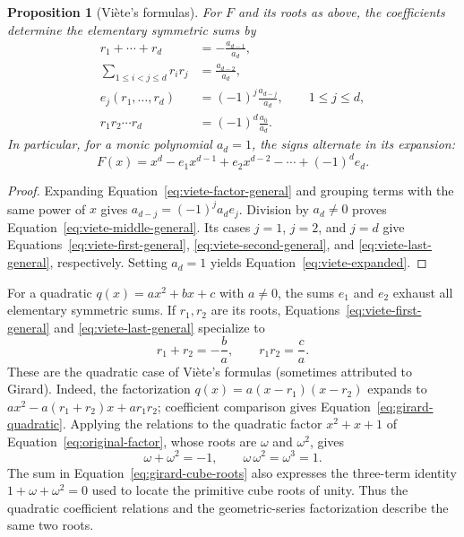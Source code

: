 \documentclass[11pt,a4paper]{article}
\numberwithin{equation}{section}
\theoremstyle{uprightpaper}
\newtheorem{proposition}{Proposition}[section]
\begin{document}
\begin{proposition}[Vi\`ete's formulas]\label{prop:viete}
For $F$ and its roots as above, the coefficients determine the elementary symmetric sums by
\begin{align}
 r_1+\cdots+r_d
   &= -\frac{a_{d-1}}{a_d},\label{eq:viete-first-general}\\
 \sum_{1\leq i<j\leq d}r_ir_j
   &= \frac{a_{d-2}}{a_d},\label{eq:viete-second-general}\\
 e_j(r_1,\ldots,r_d)
   &=(-1)^j\frac{a_{d-j}}{a_d},\qquad 1\leq j\leq d,\label{eq:viete-middle-general}\\
 r_1r_2\cdots r_d
   &=(-1)^d\frac{a_0}{a_d}.\label{eq:viete-last-general}
\end{align}
In particular, for a monic polynomial $a_d=1$, the signs alternate in its expansion:
\begin{equation}\label{eq:viete-expanded}
 F(x)=x^d-e_1x^{d-1}+e_2x^{d-2}-\cdots+(-1)^de_d.
\end{equation}
\end{proposition}
\begin{proof}
Expanding Equation~\eqref{eq:viete-factor-general} and grouping terms with the same power of $x$ gives $a_{d-j}=(-1)^ja_de_j$. Division by $a_d\neq0$ proves Equation~\eqref{eq:viete-middle-general}. Its cases $j=1$, $j=2$, and $j=d$ give Equations~\eqref{eq:viete-first-general}, \eqref{eq:viete-second-general}, and \eqref{eq:viete-last-general}, respectively. Setting $a_d=1$ yields Equation~\eqref{eq:viete-expanded}.
\end{proof}

For a quadratic $q(x)=ax^2+bx+c$ with $a\neq0$, the sums $e_1$ and $e_2$ exhaust all elementary symmetric sums. If $r_1,r_2$ are its roots, Equations~\eqref{eq:viete-first-general} and \eqref{eq:viete-last-general} specialize to
\begin{equation}\label{eq:girard-quadratic}
 r_1+r_2=-\frac{b}{a},\qquad r_1r_2=\frac{c}{a}.
\end{equation}
These are the quadratic case of Vi\`ete's formulas (sometimes attributed to Girard). Indeed, the factorization $q(x)=a(x-r_1)(x-r_2)$ expands to $ax^2-a(r_1+r_2)x+ar_1r_2$; coefficient comparison gives Equation~\eqref{eq:girard-quadratic}. Applying the relations to the quadratic factor $x^2+x+1$ of Equation~\eqref{eq:original-factor}, whose roots are $\omega$ and $\omega^2$, gives
\begin{equation}\label{eq:girard-cube-roots}
 \omega+\omega^2=-1,\qquad \omega\,\omega^2=\omega^3=1.
\end{equation}
The sum in Equation~\eqref{eq:girard-cube-roots} also expresses the three-term identity $1+\omega+\omega^2=0$ used to locate the primitive cube roots of unity. Thus the quadratic coefficient relations and the geometric-series factorization describe the same two roots.
\end{document}
